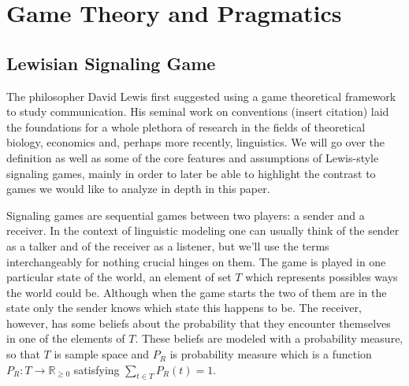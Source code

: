 \documentclass{article}
\begin{document}
\begin{comment}
\section{Pragmatics as a game between speaker and hearer}

 Baseline model: David Lewis' Signaling Game\\ 
Interpretation game - perfectly aligned utilities complete information, perfect rationality.
\begin{table}[h]
\centering
\begin{tabular}{lllll}
States & Cost Sender & Messages & Cost Receiver & {Actions} \\
$t_1$  & 0           & $m_1$    & 0                                  & $a_1$                        \\
$t_2$  & 0           & $m_2$    & 0                                  & $a_2$                       
\end{tabular}
\end{table}
\end{comment}

\section{Game Theory and Pragmatics}
\subsection{Lewisian Signaling Game}
The philosopher David Lewis first suggested using a game theoretical framework to study communication. His seminal work on conventions (insert citation) laid the foundations for a whole plethora of research in the fields of theoretical biology, economics and, perhaps more recently, linguistics. We will go over the definition as well as some of the core features and assumptions of Lewis-style signaling games, mainly in order to later be able to highlight the contrast to games we would like to analyze in depth in this paper.

Signaling games are sequential games between two players: a sender and a receiver. In the context of linguistic modeling one can usually think of the sender as a talker and of the receiver as a listener, but we'll use the terms interchangeably for nothing crucial hinges on them. The game is played in one particular state of the world, an element of set $T$ which represents possibles ways the world could be. Although when the game starts the two of them are in the state only the sender knows which state this happens to be. The receiver, however, has some beliefs about the probability that they encounter themselves in one of the elements of $T$. These beliefs are modeled with a probability measure, so that $T$ is sample space and $P_R$ is probability measure which is a function $P_R: T\rightarrow \mathbb{R}_{\geq 0}$ satisfying $\sum_{t\in T}P_R(t)=1$.
\end{document}
